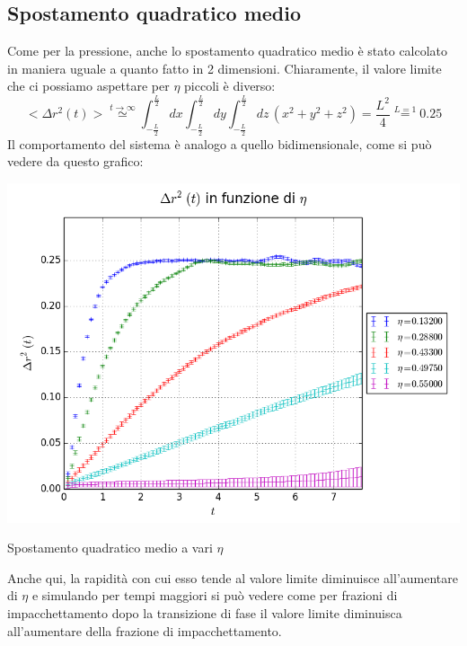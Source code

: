 \subsection{Spostamento quadratico medio}
Come per la pressione, anche lo spostamento quadratico medio è stato calcolato in maniera uguale a quanto fatto in 2 dimensioni. Chiaramente, il valore limite che ci possiamo aspettare per $\eta$ piccoli è diverso:
$$
<\Delta r^2(t)> \overset{\mathit{t\rightarrow \infty}}{\simeq} \int_{-\frac{L}{2}}^{\frac{L}{2}} dx \int_{-\frac{L}{2}}^{\frac{L}{2}}dy \int_{-\frac{L}{2}}^{\frac{L}{2}} dz \, ( x^2 + y^2 +z^2 ) = \frac{L^2}{4} \overset{\mathit{L=1}}{=} 0.25
$$
Il comportamento del sistema è analogo a quello bidimensionale, come si può vedere da questo grafico:

\begin{myfig}
	\includegraphics[scale=0.55]{sfere3D/dr2vari.png}
	\caption{Spostamento quadratico medio a vari $\eta$}
\end{myfig}
Anche qui, la rapidità con cui esso tende al valore limite diminuisce all'aumentare di $\eta$ e simulando per tempi maggiori si può vedere come per frazioni di impacchettamento dopo la transizione di fase il valore limite diminuisca all'aumentare della frazione di impacchettamento.

